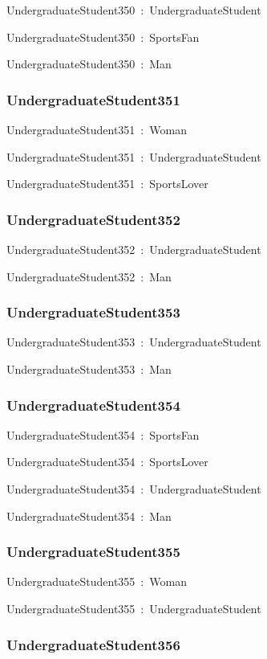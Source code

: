 \documentclass{article}
\begin{document}
UndergraduateStudent350~:~UndergraduateStudent

UndergraduateStudent350~:~SportsFan

UndergraduateStudent350~:~Man

\subsubsection*{UndergraduateStudent351}

UndergraduateStudent351~:~Woman

UndergraduateStudent351~:~UndergraduateStudent

UndergraduateStudent351~:~SportsLover

\subsubsection*{UndergraduateStudent352}

UndergraduateStudent352~:~UndergraduateStudent

UndergraduateStudent352~:~Man

\subsubsection*{UndergraduateStudent353}

UndergraduateStudent353~:~UndergraduateStudent

UndergraduateStudent353~:~Man

\subsubsection*{UndergraduateStudent354}

UndergraduateStudent354~:~SportsFan

UndergraduateStudent354~:~SportsLover

UndergraduateStudent354~:~UndergraduateStudent

UndergraduateStudent354~:~Man

\subsubsection*{UndergraduateStudent355}

UndergraduateStudent355~:~Woman

UndergraduateStudent355~:~UndergraduateStudent

\subsubsection*{UndergraduateStudent356}
\end{document}
